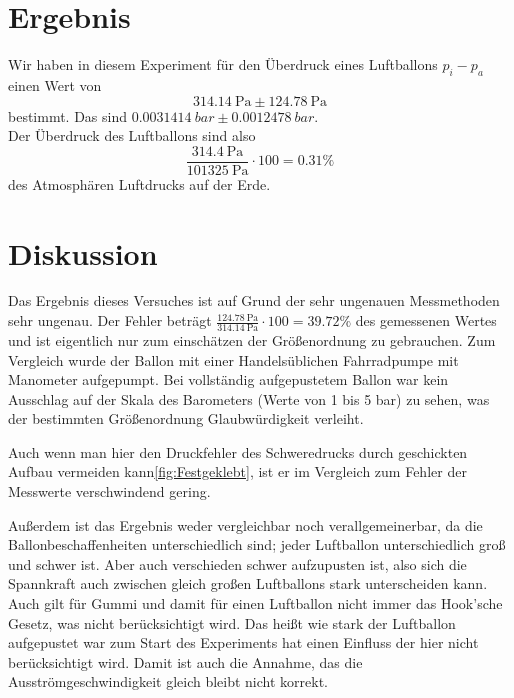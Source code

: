 \documentclass{article}
\begin{document}
    \section{Ergebnis}
        Wir haben in diesem Experiment für den Überdruck eines Luftballons \(p_i - p_a\) einen Wert von
        \[ \SI{314.14}{\pascal} \pm \SI{124.78}{\pascal} \]
        bestimmt.
        Das sind \( \SI{0.0031414}{bar} \pm \SI{0.0012478}{bar} \).\\
        Der Überdruck des Luftballons sind also
        \[ \frac{\SI{314.4}{\pascal}}{\SI{101325}{\pascal}} \cdot 100 = 0.31\% \] des Atmosphären Luftdrucks auf der Erde.

    \section{Diskussion}
        Das Ergebnis dieses Versuches ist auf Grund der sehr ungenauen Messmethoden sehr ungenau. Der Fehler beträgt \(\frac{\SI{124.78}{\pascal}}{\SI{314.14}{\pascal} } \cdot 100 = 39.72\% \)
        des gemessenen Wertes und ist eigentlich nur zum einschätzen der Größenordnung zu gebrauchen.
        Zum Vergleich wurde der Ballon mit einer Handelsüblichen Fahrradpumpe mit Manometer aufgepumpt. Bei vollständig aufgepustetem Ballon war kein Ausschlag auf der Skala des Barometers (Werte von 1 bis 5 bar)
        zu sehen, was der bestimmten Größenordnung Glaubwürdigkeit verleiht.

        Auch wenn man hier den Druckfehler des Schweredrucks durch geschickten Aufbau vermeiden kann\ref{fig:Festgeklebt}, ist er im Vergleich zum Fehler der Messwerte verschwindend gering.

        Außerdem ist das Ergebnis weder vergleichbar noch verallgemeinerbar, da die Ballonbeschaffenheiten unterschiedlich sind;
        jeder Luftballon unterschiedlich groß und schwer ist. Aber auch verschieden schwer aufzupusten ist, also sich die
        Spannkraft auch zwischen gleich großen Luftballons stark unterscheiden kann.
        Auch gilt für Gummi und damit für einen Luftballon nicht immer das Hook'sche Gesetz\cite{Gummi}, was nicht berücksichtigt wird. Das heißt wie stark der Luftballon aufgepustet war zum Start des
        Experiments hat einen Einfluss der hier nicht berücksichtigt wird. Damit ist auch die Annahme, das die Ausströmgeschwindigkeit gleich bleibt nicht korrekt.
\end{document}
